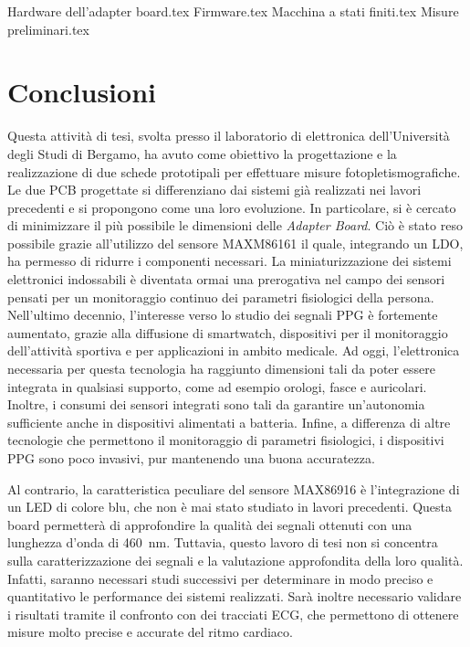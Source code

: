 \documentclass[
	a4paper,
	cleardoublepage=empty,
	headings=twolinechapter,
	numbers=autoenddot,
]{scrbook}
\begin{document}
	{Hardware dell’adapter board.tex}
	{Firmware.tex}
	{Macchina a stati finiti.tex}
	{Misure preliminari.tex}
	
	\chapter*{Conclusioni}
	Questa attività di tesi, svolta presso il laboratorio di elettronica dell'Università degli Studi di Bergamo, ha avuto come obiettivo la progettazione e la realizzazione di due schede prototipali per effettuare misure fotopletismografiche. Le due PCB progettate si differenziano dai sistemi già realizzati nei lavori precedenti e si propongono come una loro evoluzione. In particolare, si è cercato di minimizzare il più possibile le dimensioni delle \textit{Adapter Board}. Ciò è stato reso possibile grazie all'utilizzo del sensore MAXM86161 il quale, integrando un LDO, ha permesso di ridurre i componenti necessari. La miniaturizzazione dei sistemi elettronici indossabili è diventata ormai una prerogativa nel campo dei sensori pensati per un monitoraggio continuo dei parametri fisiologici della persona. Nell'ultimo decennio, l'interesse verso lo studio dei segnali PPG è fortemente aumentato, grazie alla diffusione di smartwatch, dispositivi per il monitoraggio dell'attività sportiva e per applicazioni in ambito medicale. Ad oggi, l'elettronica necessaria per questa tecnologia ha raggiunto dimensioni tali da poter essere integrata in qualsiasi supporto, come ad esempio orologi, fasce e auricolari. Inoltre, i consumi dei sensori integrati sono tali da garantire un'autonomia sufficiente anche in dispositivi alimentati a batteria. Infine, a differenza di altre tecnologie che permettono il monitoraggio di parametri fisiologici, i dispositivi PPG sono poco invasivi, pur mantenendo una buona accuratezza.
	
	Al contrario, la caratteristica peculiare del sensore MAX86916 è l'integrazione di un LED di colore blu, che non è mai stato studiato in lavori precedenti. Questa board permetterà di approfondire la qualità dei segnali ottenuti con una lunghezza d'onda di \SI{460}{\nano\meter}. Tuttavia, questo lavoro di tesi non si concentra sulla caratterizzazione dei segnali e la valutazione approfondita della loro qualità. Infatti, saranno necessari studi successivi per determinare in modo preciso e quantitativo le performance dei sistemi realizzati. Sarà inoltre necessario validare i risultati tramite il confronto con dei tracciati ECG, che permettono di ottenere misure molto precise e accurate del ritmo cardiaco.
	
\end{document}
